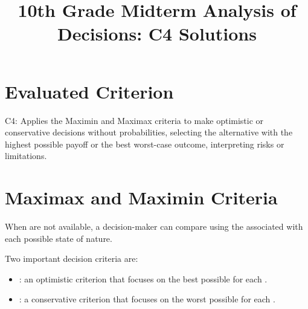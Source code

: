 \makeatletter
{}
\makeatother

%





\title{10th Grade Midterm Analysis of Decisions: C4 Solutions}
\author{}
\date{}

\pagestyle{empty}


	
	\maketitle
	\vspace*{-2.5cm}
	
	
	\section*{Evaluated Criterion}
	
	C4: Applies the Maximin and Maximax criteria to make optimistic or
	conservative decisions without probabilities, selecting the alternative
	with the highest possible payoff or the best worst-case outcome,
	interpreting risks or limitations.
	
	
	\section{Maximax and Maximin Criteria}
\label{tone:legend}

	
	When  are not available, a decision-maker can compare
	 using the  associated with each possible state of
	nature.
	
	Two important decision criteria are:
	
	\begin{itemize}[leftmargin=*]
		\item \textbf{}: an optimistic criterion that focuses on the
		best possible  for each .
		
		\item \textbf{}: a conservative criterion that focuses on the
		worst possible  for each .
	\end{itemize}
	

